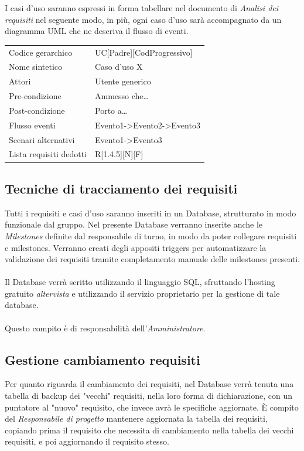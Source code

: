\documentclass[a4paper]{report}
\begin{document}
		 I casi d'uso saranno espressi in forma tabellare nel documento di \emph{Analisi dei requisiti}
		 nel seguente modo, in più, ogni caso d'uso sarà accompagnato da un diagramma UML che ne
		 descriva il flusso di eventi.
		 \begin{table}[H]
			\begin{tabularx}{\textwidth}{X | X}\toprule
				\rowcolor{orange!65}Codice gerarchico & UC[Padre][CodProgressivo] \\
				Nome sintetico & Caso d'uso X \\
				\rowcolor{orange!65}Attori & Utente generico\\
				Pre-condizione & Ammesso che\dots \\
				\rowcolor{orange!65}Post-condizione & Porto a\dots \\
				Flusso eventi & Evento1->Evento2->Evento3\\
				\rowcolor{orange!65}Scenari alternativi & Evento1->Evento3\\
				Lista requisiti dedotti & R[1.4.5][N][F]\\
				\bottomrule
			\end{tabularx}
		 \end{table}

	\subsection{Tecniche di tracciamento dei requisiti}
		Tutti i requisiti e casi d'uso saranno inseriti in un Database, strutturato in modo funzionale
		 dal gruppo. Nel presente Database verranno 	inserite anche le \emph{Milestones} definite 
		 dal responsabile di turno, in modo da poter collegare requisiti e milestones. Verranno 
		 creati degli appositi triggers per automatizzare la validazione dei requisiti tramite
		  completamento manuale delle	milestones presenti. 
		\\ \\ 
		Il Database verrà scritto utilizzando il linguaggio SQL, sfruttando l'hosting gratuito
		\emph{altervista} e utilizzando il servizio proprietario per la gestione di tale database.
		\\ \\
		Questo compito è di responsabilità dell'\emph{Amministratore}.
	\subsection{Gestione cambiamento requisiti}
	Per quanto riguarda il cambiamento dei requisiti, nel Database verrà tenuta una tabella di backup dei "vecchi" requisiti, 
	nella loro forma di dichiarazione, con un puntatore al "nuovo" requisito, che invece avrà le specifiche aggiornate. È compito del
	\emph{Responsabile di progetto} mantenere aggiornata la tabella dei requisiti, copiando prima il requisito che necessita di cambiamento
	nella tabella dei vecchi requisiti, e poi aggiornando il requisito stesso.
	
\end{document}

